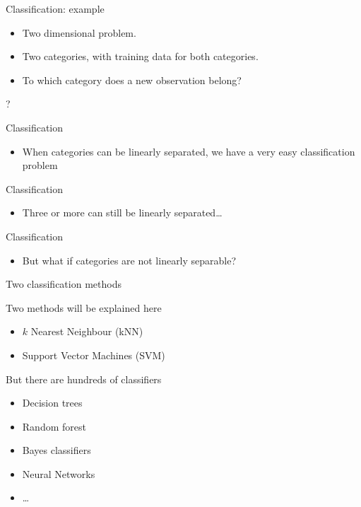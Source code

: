 \documentclass[compress]{beamer}
\providecommand{\tightlist}{%
  \setlength{\itemsep}{0pt}\setlength{\parskip}{0pt}}
\begin{document}
\begin{frame}{Classification: example}

\begin{itemize}
\tightlist
\item
  Two dimensional problem.
\item
  Two categories, with training data for both categories.
\item
  To which category does a new observation belong?
\end{itemize}

?

\end{frame}

\begin{frame}{Classification}

\begin{itemize}
\tightlist
\item
  When categories can be linearly separated, we have a very easy
  classification problem
\end{itemize}

\end{frame}

\begin{frame}{Classification}

\begin{itemize}
\tightlist
\item
  Three or more can still be linearly separated\ldots{}
\end{itemize}

\end{frame}

\begin{frame}{Classification}

\begin{itemize}
\tightlist
\item
  But what if categories are not linearly separable?
\end{itemize}

\end{frame}

\begin{frame}{Two classification methods}

Two methods will be explained here

\begin{itemize}
\tightlist
\item
  \(k\) Nearest Neighbour (kNN)
\item
  Support Vector Machines (SVM)
\end{itemize}

But there are hundreds of classifiers

\begin{itemize}
\tightlist
\item
  Decision trees
\item
  Random forest
\item
  Bayes classifiers
\item
  Neural Networks
\item
  \ldots{}
\end{itemize}

\end{frame}
\end{document}
